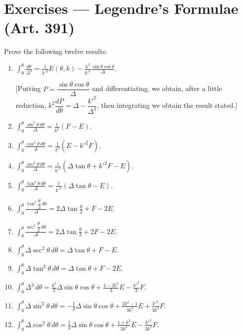 \documentclass[11pt, a4paper]{article}
\begin{document}
\section*{Exercises --- Legendre's Formulae (Art. 391)}

Prove the following twelve results:

\begin{enumerate}[leftmargin=2em]

\item $\displaystyle\int_0^\theta\frac{d\theta}{\Delta^3}=\frac{1}{k'^2}E(\theta,k)-\frac{k^2}{k'^2}\frac{\sin\theta\cos\theta}{\Delta}$.

[Putting $P=\dfrac{\sin\theta\cos\theta}{\Delta}$ and differentiating, we obtain, after a little reduction, $k^2\dfrac{dP}{d\theta}=\Delta-\dfrac{k'^2}{\Delta^3}$, then integrating we obtain the result stated.]

\item $\displaystyle\int_0^\theta\frac{\sin^2\theta\,d\theta}{\Delta}=\frac{1}{k^2}(F-E)$.

\item $\displaystyle\int_0^\theta\frac{\cos^2\theta\,d\theta}{\Delta}=\frac{1}{k^2}(E-k'^2F)$.

\item $\displaystyle\int_0^\theta\frac{\sec^2\theta\,d\theta}{\Delta}=\frac{1}{k'^2}(\Delta\tan\theta+k'^2F-E)$.

\item $\displaystyle\int_0^\theta\frac{\tan^2\theta\,d\theta}{\Delta}=\frac{1}{k'^2}(\Delta\tan\theta-E)$.

\item $\displaystyle\int_0^\theta\frac{\tan^2\dfrac{\theta}{2}\,d\theta}{\Delta}=2\Delta\tan\frac{\theta}{2}+F-2E$.

\item $\displaystyle\int_0^\theta\frac{\sec^2\dfrac{\theta}{2}\,d\theta}{\Delta}=2\Delta\tan\frac{\theta}{2}+2F-2E$.

\item $\displaystyle\int_0^\theta\Delta\sec^2\theta\,d\theta=\Delta\tan\theta+F-E$.

\item $\displaystyle\int_0^\theta\Delta\tan^2\theta\,d\theta=\Delta\tan\theta+F-2E$.

\item $\displaystyle\int_0^\theta\Delta^3\,d\theta=\frac{k^2}{3}\Delta\sin\theta\cos\theta+\frac{4-2k^2}{3}E-\frac{k'^2}{3}F$.

\item $\displaystyle\int_0^\theta\Delta\sin^2\theta\,d\theta=-\frac13\Delta\sin\theta\cos\theta+\frac{2k^2-1}{3k^2}E+\frac{k'^2}{3k^2}F$.

\item $\displaystyle\int_0^\theta\Delta\cos^2\theta\,d\theta=\frac13\Delta\sin\theta\cos\theta+\frac{1+k^2}{3k^2}E-\frac{k'^2}{3k^2}F$.

\end{enumerate}
\end{document}

